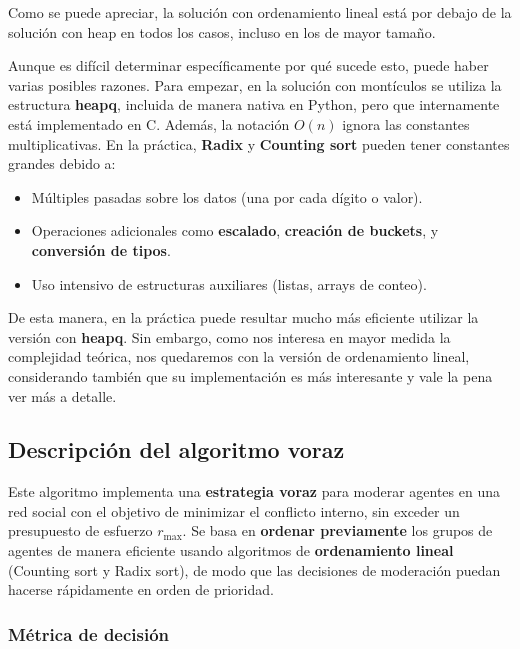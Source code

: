 Como se puede apreciar, la solución con ordenamiento lineal está por debajo de la solución con heap en todos los casos, incluso en los de mayor tamaño.

Aunque es difícil determinar específicamente por qué sucede esto, puede haber varias posibles razones. Para empezar, en la solución con montículos se utiliza la estructura \textbf{heapq}, incluida de manera nativa en Python, pero que internamente está implementado en C. Además, la notación $O(n)$ ignora las constantes multiplicativas. En la práctica, \textbf{Radix} y \textbf{Counting sort} pueden tener constantes grandes debido a:

\begin{itemize}
	\item Múltiples pasadas sobre los datos (una por cada dígito o valor).

	\item Operaciones adicionales como \textbf{escalado}, \textbf{creación de buckets}, y \textbf{conversión de tipos}.

	\item Uso intensivo de estructuras auxiliares (listas, arrays de conteo).
\end{itemize}

De esta manera, en la práctica puede resultar mucho más eficiente utilizar la versión con \textbf{heapq}. Sin embargo, como nos interesa en mayor medida la complejidad teórica, nos quedaremos con la versión de ordenamiento lineal, considerando también que su implementación es más interesante y vale la pena ver más a detalle.

\subsection{Descripción del algoritmo voraz}

Este algoritmo implementa una \textbf{estrategia voraz} para moderar agentes en una red social con el objetivo de minimizar el conflicto interno, sin exceder un presupuesto de esfuerzo $r_{ \max }$. Se basa en \textbf{ordenar previamente} los grupos de agentes de manera eficiente usando algoritmos de \textbf{ordenamiento lineal} (Counting sort y Radix sort), de modo que las decisiones de moderación puedan hacerse rápidamente en orden de prioridad.

\subsubsection{Métrica de decisión}

